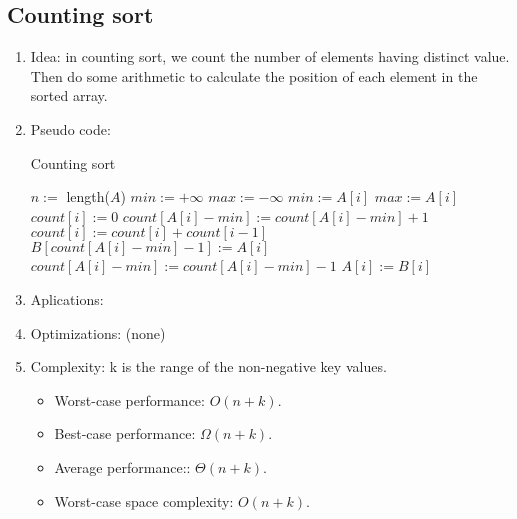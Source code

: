 \documentclass[12pt]{article}
\begin{document}
    \subsection{Counting sort}
    \begin{enumerate}
        \item Idea: in counting sort, we count the number of elements having distinct value. Then do some arithmetic to calculate the position of each element in the sorted array.
        \item Pseudo code:
        \begin{algorithm}[H]
            \caption{Counting sort}
            \begin{algorithmic}[1]
                    \State $n:=$ length($A$)
                    \State $\textit{min}:=+\infty$
                    \State $\textit{max}:=-\infty$
                            \State $\textit{min}:=A[i]$
                        \EndIf
                            \State $\textit{max}:=A[i]$
                        \EndIf
                    \EndFor 
                        \State $\textit{count}[i]:=0$
                    \EndFor
                        \State $\textit{count}[A[i]-\textit{min}]:=\textit{count}[A[i]-\textit{min}]+1$
                    \EndFor
                        \State $\textit{count}[i]:=\textit{count}[i]+\textit{count}[i-1]$
                    \EndFor
                        \State $B[\textit{count}[A[i]-\textit{min}]-1]:=A[i]$
                        \State $\textit{count}[A[i]-\textit{min}]:=\textit{count}[A[i]-\textit{min}]-1$
                    \EndFor
                        \State $A[i]:=B[i]$
                    \EndFor
                \EndFunction
            \end{algorithmic}
        \end{algorithm}
        \item Aplications:
        \item Optimizations: (none)
        \item Complexity: k is the range of the non-negative key values.
        \begin{itemize}
            \item Worst-case performance: $O(n+k)$.
            \item Best-case performance: $\Omega(n+k)$.
            \item Average performance:: $\Theta(n+k)$.
            \item Worst-case space complexity: $O(n+k)$.
        \end{itemize}
    \end{enumerate}
    
\end{document}
